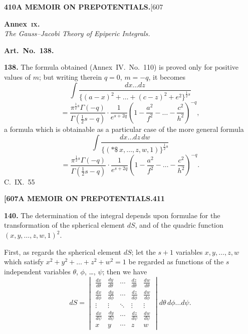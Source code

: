\documentclass[11pt,a4paper]{book}
\begin{document}
{\newpage
\noindent\textbf{410}\hspace{\fill}\textbf{A MEMOIR ON PREPOTENTIALS.}\hspace{\fill}[607

\noindent\textbf{Annex~\textsc{ix.}}\\
\textit{The Gauss--Jacobi Theory of Epiperic Integrals.}

\medskip
\noindent\textbf{Art.~No.~138.}

\noindent\textbf{138.}
The formula obtained (Annex~IV.\ No.~110) is proved only for positive values of $m$; but writing therein $q = 0$, $m = -q$, it becomes
\[
\int \frac{dx\ldots dz}{\{(a-x)^2 + \ldots + (c-z)^2 + e^2\}^{\frac{1}{2}s}}
\]
\[
= \frac{\pi^{\frac{1}{2}s}\Gamma(-q)}{\Gamma(\frac{1}{2}s-q)} \cdot \frac{1}{e^{s+2q}} \left(1 - \frac{a^2}{f^2} - \ldots - \frac{c^2}{h^2}\right)^{-q},
\]
a formula which is obtainable as a particular case of the more general formula
\[
\int \frac{dx\ldots dz\, dw}{\{(*\!\!\$\, x, \ldots, z, w, 1)\}^{\frac{1}{2}s}}
\]
\[
= \frac{\pi^{\frac{1}{2}s}\Gamma(-q)}{\Gamma(\frac{1}{2}s-q)} \cdot \frac{1}{e^{s+2q}} \left(1 - \frac{a^2}{f^2} - \ldots - \frac{c^2}{h^2}\right)^{-q}.
\]
\hfill C.~IX.\ 55

\newpage
\noindent\textbf{[607}\hspace{\fill}\textbf{A MEMOIR ON PREPOTENTIALS.}\hspace{\fill}\textbf{411}

\noindent\textbf{140.}
The determination of the integral depends upon formulae for the transformation of the spherical element $dS$, and of the quadric function $(x, y, \ldots, z, w, 1)^2$.

First, as regards the spherical element $dS$; let the $s+1$ variables $x, y, \ldots, z, w$ which satisfy $x^2 + y^2 + \ldots + z^2 + w^2 = 1$ be regarded as functions of the $s$ independent variables $\theta$, $\phi$, \ldots, $\psi$; then we have
\[
dS = \begin{vmatrix}
\frac{dx}{d\theta} & \frac{dy}{d\theta} & \cdots & \frac{dz}{d\theta} & \frac{dw}{d\theta}\\[4pt]
\frac{dx}{d\phi} & \frac{dy}{d\phi} & \cdots & \frac{dz}{d\phi} & \frac{dw}{d\phi}\\[4pt]
\vdots & \vdots & \ddots & \vdots & \vdots\\[4pt]
\frac{dx}{d\psi} & \frac{dy}{d\psi} & \cdots & \frac{dz}{d\psi} & \frac{dw}{d\psi}\\[4pt]
x & y & \cdots & z & w
\end{vmatrix} d\theta\, d\phi \ldots d\psi.
\]

}
\end{document}
